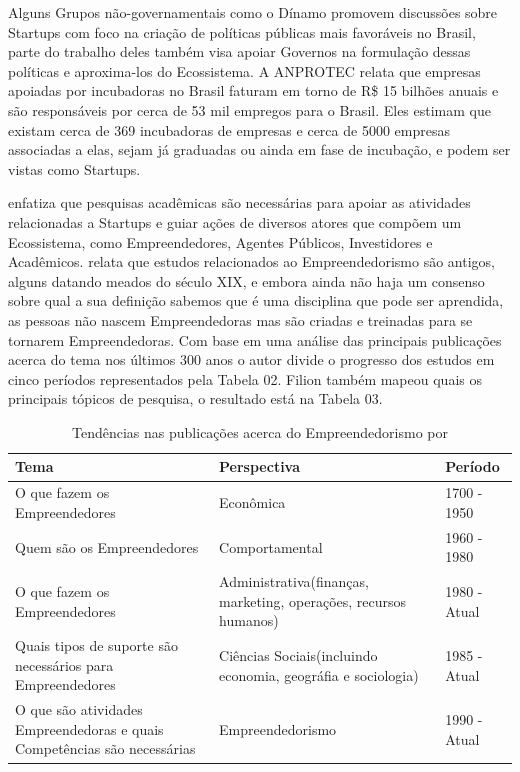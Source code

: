 Alguns Grupos não-governamentais como o Dínamo promovem discussões sobre Startups com foco na criação de políticas públicas mais favoráveis no Brasil, parte do trabalho deles também visa apoiar Governos na formulação dessas políticas e aproxima-los do Ecossistema. A ANPROTEC relata que empresas apoiadas por incubadoras no Brasil faturam em torno de R\$ 15 bilhões anuais e são responsáveis por cerca de 53 mil empregos para o Brasil. Eles estimam que existam cerca de 369 incubadoras de empresas e cerca de 5000 empresas associadas a elas, sejam já graduadas ou ainda em fase de incubação, e podem ser vistas como Startups. 

 enfatiza que pesquisas acadêmicas são necessárias para apoiar as atividades relacionadas a Startups e guiar ações de diversos atores que compõem um Ecossistema, como Empreendedores, Agentes Públicos, Investidores e Acadêmicos.  relata que estudos relacionados ao Empreendedorismo são antigos, alguns datando meados do século XIX, e embora ainda não haja um consenso sobre qual a sua definição sabemos que é uma disciplina que pode ser aprendida, as pessoas não nascem Empreendedoras mas são criadas e treinadas para se tornarem Empreendedoras. Com base em uma análise das principais publicações acerca do tema nos últimos 300 anos o autor divide o progresso dos estudos em cinco períodos representados pela Tabela 02. Filion também mapeou quais os principais tópicos de pesquisa, o resultado está na Tabela 03.

\begin{table}[!htb]
	\centering
	\label{tabela:tendencias_nas_publicacoes_acerca_do_empreendedorismo}
	\begin{tabular}{ | p{6cm} | p{6cm} | p{3cm} | }
		\hline
		Tema & Perspectiva & Período \\ \hline
		O que fazem os Empreendedores & Econômica & 1700 - 1950 \\ \hline
		Quem são os Empreendedores & Comportamental & 1960 - 1980 \\ \hline
		O que fazem os Empreendedores & Administrativa(finanças, marketing, operações, recursos humanos) & 1980 - Atual \\ \hline
		Quais tipos de suporte são necessários para Empreendedores & Ciências Sociais(incluindo economia, geográfia e sociologia) & 1985 - Atual \\ \hline
		O que são atividades Empreendedoras e quais Competências são necessárias & Empreendedorismo & 1990 - Atual \\ \hline
	\end{tabular}
	\caption{Tendências nas publicações acerca do Empreendedorismo por \cite{Filion1998}}
\end{table}

